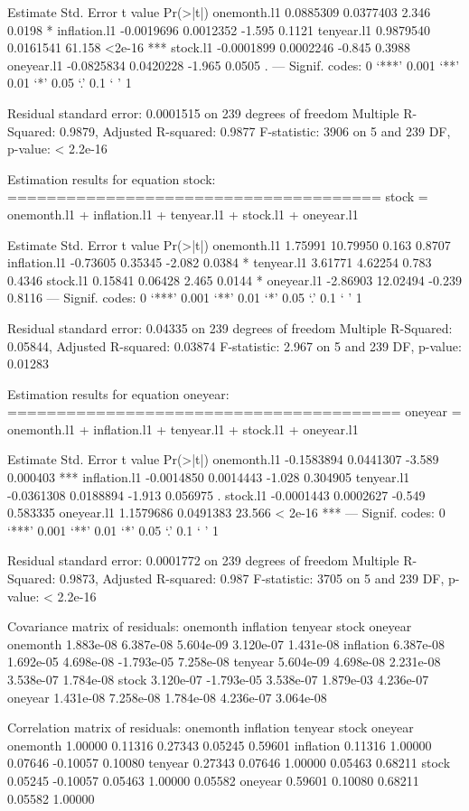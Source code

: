 \documentclass[11pt]{article}
\begin{document}
\begin{Schunk}
\begin{Soutput}
               Estimate Std. Error t value Pr(>|t|)    
onemonth.l1   0.0885309  0.0377403   2.346   0.0198 *  
inflation.l1 -0.0019696  0.0012352  -1.595   0.1121    
tenyear.l1    0.9879540  0.0161541  61.158   <2e-16 ***
stock.l1     -0.0001899  0.0002246  -0.845   0.3988    
oneyear.l1   -0.0825834  0.0420228  -1.965   0.0505 .  
---
Signif. codes:  0 ‘***’ 0.001 ‘**’ 0.01 ‘*’ 0.05 ‘.’ 0.1 ‘ ’ 1


Residual standard error: 0.0001515 on 239 degrees of freedom
Multiple R-Squared: 0.9879,	Adjusted R-squared: 0.9877 
F-statistic:  3906 on 5 and 239 DF,  p-value: < 2.2e-16 


Estimation results for equation stock: 
====================================== 
stock = onemonth.l1 + inflation.l1 + tenyear.l1 + stock.l1 + oneyear.l1 

             Estimate Std. Error t value Pr(>|t|)  
onemonth.l1   1.75991   10.79950   0.163   0.8707  
inflation.l1 -0.73605    0.35345  -2.082   0.0384 *
tenyear.l1    3.61771    4.62254   0.783   0.4346  
stock.l1      0.15841    0.06428   2.465   0.0144 *
oneyear.l1   -2.86903   12.02494  -0.239   0.8116  
---
Signif. codes:  0 ‘***’ 0.001 ‘**’ 0.01 ‘*’ 0.05 ‘.’ 0.1 ‘ ’ 1


Residual standard error: 0.04335 on 239 degrees of freedom
Multiple R-Squared: 0.05844,	Adjusted R-squared: 0.03874 
F-statistic: 2.967 on 5 and 239 DF,  p-value: 0.01283 


Estimation results for equation oneyear: 
======================================== 
oneyear = onemonth.l1 + inflation.l1 + tenyear.l1 + stock.l1 + oneyear.l1 

               Estimate Std. Error t value Pr(>|t|)    
onemonth.l1  -0.1583894  0.0441307  -3.589 0.000403 ***
inflation.l1 -0.0014850  0.0014443  -1.028 0.304905    
tenyear.l1   -0.0361308  0.0188894  -1.913 0.056975 .  
stock.l1     -0.0001443  0.0002627  -0.549 0.583335    
oneyear.l1    1.1579686  0.0491383  23.566  < 2e-16 ***
---
Signif. codes:  0 ‘***’ 0.001 ‘**’ 0.01 ‘*’ 0.05 ‘.’ 0.1 ‘ ’ 1


Residual standard error: 0.0001772 on 239 degrees of freedom
Multiple R-Squared: 0.9873,	Adjusted R-squared: 0.987 
F-statistic:  3705 on 5 and 239 DF,  p-value: < 2.2e-16 



Covariance matrix of residuals:
           onemonth  inflation   tenyear      stock   oneyear
onemonth  1.883e-08  6.387e-08 5.604e-09  3.120e-07 1.431e-08
inflation 6.387e-08  1.692e-05 4.698e-08 -1.793e-05 7.258e-08
tenyear   5.604e-09  4.698e-08 2.231e-08  3.538e-07 1.784e-08
stock     3.120e-07 -1.793e-05 3.538e-07  1.879e-03 4.236e-07
oneyear   1.431e-08  7.258e-08 1.784e-08  4.236e-07 3.064e-08

Correlation matrix of residuals:
          onemonth inflation tenyear    stock oneyear
onemonth   1.00000   0.11316 0.27343  0.05245 0.59601
inflation  0.11316   1.00000 0.07646 -0.10057 0.10080
tenyear    0.27343   0.07646 1.00000  0.05463 0.68211
stock      0.05245  -0.10057 0.05463  1.00000 0.05582
oneyear    0.59601   0.10080 0.68211  0.05582 1.00000
\end{Soutput}
\end{Schunk}
\end{document}
